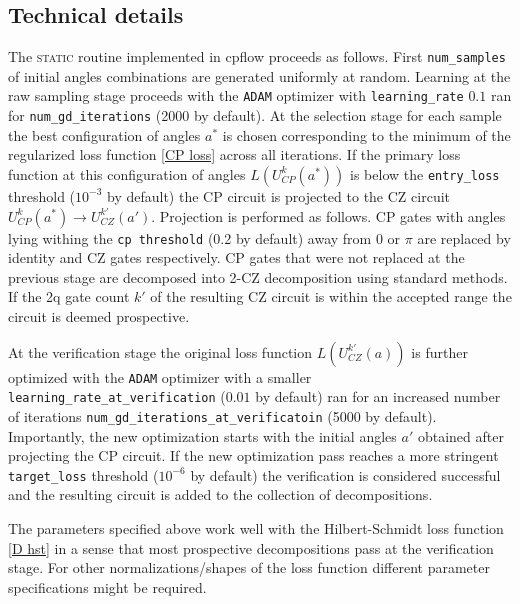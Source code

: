 \documentclass[draft, amsfonts, amssymb, aps, nofootinbib, twocolumn]{revtex4-2}
\newcommand{\CZ}{CZ }
\newcommand{\CP}{CP }
\newcommand{\cpflow}{\textrm {cpflow }}
\newcommand{\static}{\textsc{static }}
\newcommand{\param}[1]{\texttt{#1}}
\begin{document}
\subsection{Technical details \label{sec details}}
The \static routine implemented in \cpflow proceeds as follows.
First \param{num\_samples} of initial angles combinations are generated uniformly at random. Learning at the raw sampling stage proceeds with the \param{ADAM} optimizer with \param{learning\_rate} $0.1$ ran for \param{num\_gd\_iterations} (2000 by default).
At the selection stage for each sample the best configuration of angles $a^*$ is chosen corresponding to the minimum of the regularized loss function \eqref{CP loss} across all iterations. If the primary loss function at this configuration of angles $L(U_{CP}^k(a^*))$ is below the \param{entry\_loss} threshold ($10^{-3}$ by default) the \CP circuit is projected to the \CZ circuit $U_{CP}^k(a^*)\to U_{CZ}^{k'}(a')$. Projection is performed as follows. \CP gates with angles lying withing the \param{cp threshold}  (0.2 by default) away from $0$ or $\pi$ are replaced by identity and \CZ gates respectively.  \CP gates that were not replaced at the previous stage are decomposed into 2-\CZ decomposition using standard methods. If the 2q gate count $k'$ of the resulting \CZ circuit is within the accepted range the circuit is deemed prospective.

At the verification stage the original loss function $L(U_{CZ}^{k'}(a))$ is further optimized with the \param{ADAM} optimizer with a smaller \param{learning\_rate\_at\_verification} ($0.01$ by default) ran for an increased number of iterations \param{num\_gd\_iterations\_at\_verificatoin} (5000 by default). Importantly, the new optimization starts with the initial angles $a'$ obtained after projecting the \CP circuit. If the new optimization pass reaches a more stringent \param{target\_loss} threshold ($10^{-6}$ by default) the verification is considered successful and the resulting circuit is added to the collection of decompositions. 

The parameters specified above work well with the Hilbert-Schmidt loss function \eqref{D hst} in a sense that most prospective decompositions pass at the verification stage. For other normalizations/shapes of the loss function different parameter specifications might be required.
\end{document}
